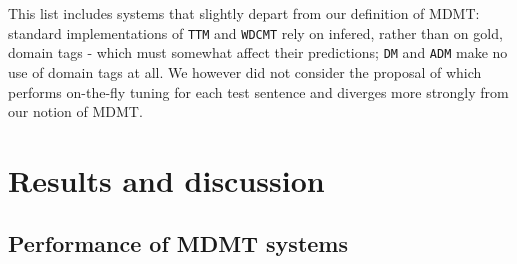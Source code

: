 \documentclass[11pt,a4paper]{article}
\newcommand{\fyDone}[1]{\done[FY]\Todo[FY:]{\textcolor{orange}{#1}}}
\newcommand{\revision}[1]{#1}
\newcommand{\system}[1]{\texttt{{#1}}}
\begin{document}
\begin{itemize}
\end{itemize}
\revision{This list includes systems that slightly depart from our definition of MDMT: standard implementations of \system{TTM} and \system{WDCMT} rely on infered, rather than on gold, domain tags - which must somewhat affect their predictions; \system{DM} and \system{ADM} make no use of domain tags at all.} We however did not consider the proposal of \cite{Farajian17multidomain} which performs on-the-fly tuning for each test sentence and diverges more strongly from our notion of MDMT. %

\section{Results and discussion \label{sec:results}}

\subsection{Performance of MDMT systems \label{ssec:rawperformance}}
\end{document}
